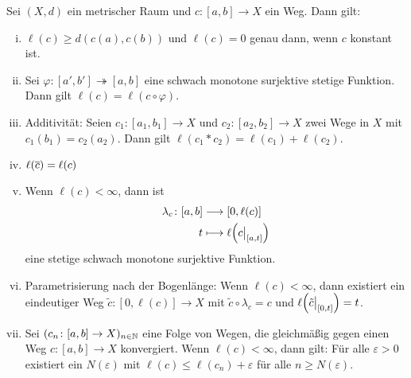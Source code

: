 \begin{proposition}
\label{prop:2.6}
	Sei $(X,d)$ ein metrischer Raum und $c\colon [a,b] \rightarrow X$ ein Weg.
	Dann gilt:
	\begin{enumerate}[(i)]
		\item $\ell(c) \geq d(c(a),c(b))$ und $\ell(c) = 0$ genau dann, wenn $c$ konstant ist.
		\item Sei $\varphi\colon [a',b'] \twoheadrightarrow [a,b]$ eine schwach monotone surjektive stetige Funktion.
		Dann gilt $\ell(c) = \ell(c\circ \varphi)$.
		\item Additivität: Seien $c_1 \colon [a_1,b_1] \rightarrow X$ und $c_2 \colon [a_2,b_2] \rightarrow X$ zwei Wege in $X$ mit $c_1(b_1) = c_2(a_2)$.
		Dann gilt $\ell(c_1 * c_2) = \ell(c_1) + \ell(c_2)$.
		\item $\ell(\overline{c}) = \ell(c)$
		\item Wenn $\ell(c) < \infty$, dann ist
		\begin{align*}
			\lambda_c \colon [a,b] &\longrightarrow [0,\ell(c)] \\
			t &\longmapsto \ell\enbrace*{c \big|_{[a,t]}}
		\end{align*}
		eine stetige schwach monotone surjektive Funktion.
		\item Parametrisierung nach der Bogenlänge: Wenn $\ell(c) < \infty$, dann existiert ein eindeutiger Weg $\tilde{c} \colon [0,\ell(c)] \rightarrow X$ mit $\tilde{c} \circ \lambda_c = c$ und $\ell\enbrace*{\tilde{c} \big|_{[0,t]}} = t$.
		\item Sei $(c_n \colon [a,b] \rightarrow X)_{n \in \mathbb{N}}$ eine Folge von Wegen, die gleichmäßig gegen einen Weg $c \colon [a,b] \rightarrow X$ konvergiert.
		Wenn $\ell(c) < \infty$, dann gilt:
		Für alle $\varepsilon > 0$ existiert ein $N(\varepsilon)$ mit $\ell(c) \leq \ell(c_n) + \varepsilon$ für alle $n \geq N(\varepsilon)$.
	\end{enumerate}
\end{proposition}

